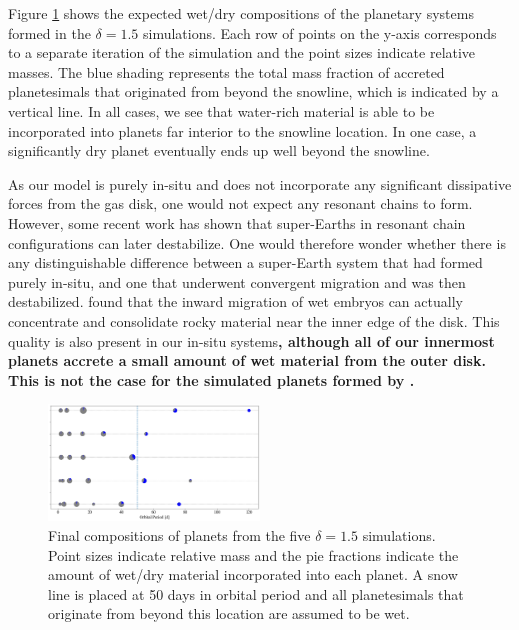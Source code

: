 Figure \ref{fig:snowline} shows the expected wet/dry compositions of the planetary systems formed in the $\delta = 1.5$ simulations. Each row of points on the y-axis corresponds to a separate iteration of the simulation and the point sizes indicate relative masses. The blue shading represents the total mass fraction of accreted planetesimals that originated from beyond the snowline, which is indicated by a vertical line. In all cases, we see that water-rich material is able to be incorporated into planets far interior to the snowline location. In one case, a significantly dry planet eventually ends up well beyond the snowline.

As our model is purely in-situ and does not incorporate any significant dissipative forces from the gas disk, one would not expect any resonant chains to form. However, some recent work \cite{izidoro17, raymond18} has shown that super-Earths in resonant chain configurations can later destabilize. One would therefore wonder whether there is any distinguishable difference between a super-Earth system that had formed purely in-situ, and one that underwent convergent migration and was then destabilized. \cite{raymond18} found that the inward migration of wet embryos can actually concentrate and consolidate rocky material near the inner edge of the disk. This quality is also present in our in-situ systems\textbf{, although all of our innermost planets accrete a small amount of wet material from the outer disk. This is not the case for the simulated planets formed by \cite{raymond18}.}

\begin{figure}
\begin{center}
    \includegraphics[width=0.5\textwidth]{figures/stip/snowline.png}
    \caption{Final compositions of planets from the five $\delta = 1.5$ simulations. Point sizes indicate relative mass and the pie fractions indicate the amount of wet/dry material incorporated into each planet. A snow line is placed at 50 days in orbital period and all planetesimals that originate from beyond this location are assumed to be wet.\label{fig:snowline}}
\end{center}
\end{figure}

